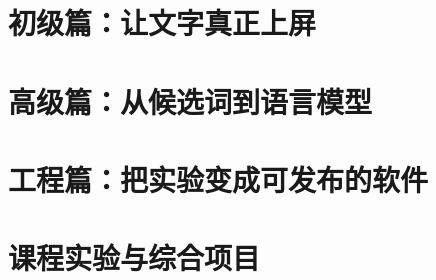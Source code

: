 \documentclass[UTF8,fontset=fandol,11pt,openany]{ctexbook}
\begin{document}
\frontmatter

\tableofcontents

\mainmatter
\part{初级篇：让文字真正上屏}


\part{高级篇：从候选词到语言模型}


\part{工程篇：把实验变成可发布的软件}


\part{课程实验与综合项目}


\appendix


\backmatter
\printindex

\end{document}
